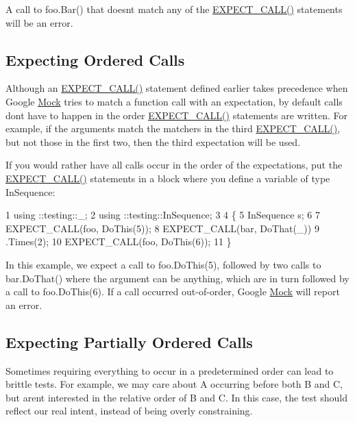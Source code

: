 A call to {\ttfamily foo.\+Bar()} that doesn\textquotesingle{}t match any of the {\ttfamily \hyperlink{gmock-spec-builders_8h_a535a6156de72c1a2e25a127e38ee5232}{E\+X\+P\+E\+C\+T\+\_\+\+C\+A\+L\+L()}} statements will be an error.

\subsection*{Expecting Ordered Calls}

Although an {\ttfamily \hyperlink{gmock-spec-builders_8h_a535a6156de72c1a2e25a127e38ee5232}{E\+X\+P\+E\+C\+T\+\_\+\+C\+A\+L\+L()}} statement defined earlier takes precedence when Google \hyperlink{class_mock}{Mock} tries to match a function call with an expectation, by default calls don\textquotesingle{}t have to happen in the order {\ttfamily \hyperlink{gmock-spec-builders_8h_a535a6156de72c1a2e25a127e38ee5232}{E\+X\+P\+E\+C\+T\+\_\+\+C\+A\+L\+L()}} statements are written. For example, if the arguments match the matchers in the third {\ttfamily \hyperlink{gmock-spec-builders_8h_a535a6156de72c1a2e25a127e38ee5232}{E\+X\+P\+E\+C\+T\+\_\+\+C\+A\+L\+L()}}, but not those in the first two, then the third expectation will be used.

If you would rather have all calls occur in the order of the expectations, put the {\ttfamily \hyperlink{gmock-spec-builders_8h_a535a6156de72c1a2e25a127e38ee5232}{E\+X\+P\+E\+C\+T\+\_\+\+C\+A\+L\+L()}} statements in a block where you define a variable of type {\ttfamily In\+Sequence}\+:


\begin{DoxyCode}
1 using ::testing::\_;
2 using ::testing::InSequence;
3 
4 \{
5   InSequence s;
6 
7   EXPECT\_CALL(foo, DoThis(5));
8   EXPECT\_CALL(bar, DoThat(\_))
9       .Times(2);
10   EXPECT\_CALL(foo, DoThis(6));
11 \}
\end{DoxyCode}


In this example, we expect a call to {\ttfamily foo.\+Do\+This(5)}, followed by two calls to {\ttfamily bar.\+Do\+That()} where the argument can be anything, which are in turn followed by a call to {\ttfamily foo.\+Do\+This(6)}. If a call occurred out-\/of-\/order, Google \hyperlink{class_mock}{Mock} will report an error.

\subsection*{Expecting Partially Ordered Calls}

Sometimes requiring everything to occur in a predetermined order can lead to brittle tests. For example, we may care about {\ttfamily A} occurring before both {\ttfamily B} and {\ttfamily C}, but aren\textquotesingle{}t interested in the relative order of {\ttfamily B} and {\ttfamily C}. In this case, the test should reflect our real intent, instead of being overly constraining.

